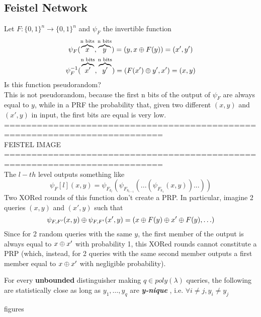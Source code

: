\subsection{Feistel Network}
Let $F:\{0,1\}^{n} \to \{0,1\}^{n} $ and $\psi_{F}$ the invertible function
\begin{gather*}
    \psi_{F}(\overbrace{x}^{\text{n bits}}, \overbrace{y}^{\text{n bits}})= (y,
    x \oplus F(y))=(x', y')\\
    \psi^{-1}_{F}(\overbrace{x'}^{\text{n bits}}, \overbrace{y'}^{\text{n
    bits}})= (F(x') \oplus y', x')=(x, y)
\end{gather*}
Is this function pseudorandom?\\
This is not pseudorandom, because the first n bits of the output of $\psi_{F}$
are always equal to $y$, while in a PRF the probability that, given two
different $(x, y)$ and $(x', y)$ in input, the first bits are equal is very
low.\\

===========================================================================\\
FEISTEL IMAGE\\
===========================================================================\\
The $l-th$ level outputs something like 
\[
    \psi_{F}[l](x,y)=\psi_{F_{k_{l}}}(\psi_{F_{k_{l-1}}}(...(\psi_{F_{k_{1}}}(x,y))...))
\]
Two XORed rounds of this function don't create a PRP. In particular, imagine 2 queries 
$(x, y)$ and $(x', y)$ such that
\[
    \psi_{F, F'}(x,y) \oplus  \psi_{F,F'}(x',y)=(x \oplus F(y) \oplus x' \oplus F(y),
    \ldots)
\]
Since for 2 random queries with the same $y$, the first member of the output is
always equal to  $x \oplus x'$ with probability 1, this XORed rounds cannot
constitute a PRP (which, instead, for 2 queries with the same second member
outputs a first member equal to $x \oplus x'$ with negligible probability).\\

\begin{lemma}
    For every \textbf{unbounded}  distinguisher making $q \in poly(\lambda)$
    queries, the following are statistically close as long as $y_{1}, \ldots,
    y_{q}$ are \textbf{ \textit{y-nique} } , i.e. $ \forall i \not= j, y_{i}
    \not= y_{j}$
\end{lemma}
figures

